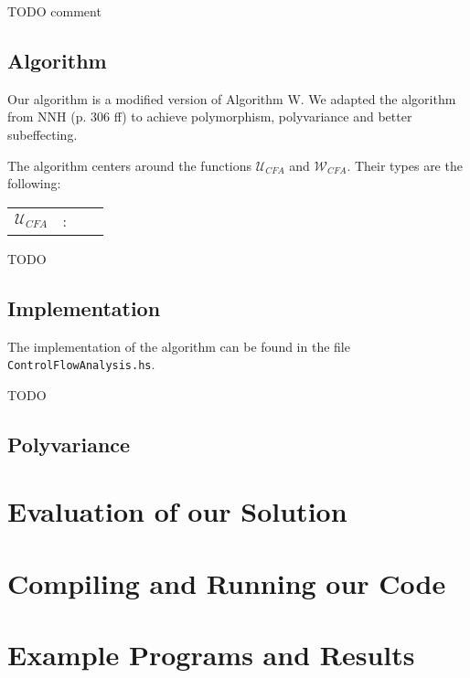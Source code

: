 \documentclass[a4paper,11pt]{article}
\begin{document}
\begin{prooftree}
\end{prooftree}

TODO comment

\subsection{Algorithm}
Our algorithm is a modified version of Algorithm W. We adapted the algorithm from NNH (p. 306 ff) to achieve polymorphism, polyvariance and better subeffecting. 

The algorithm centers around the functions $\mathcal{U}_{CFA}$ and $\mathcal{W}_{CFA}$. Their types are the following:
\begin{tabular}{l l l l}
$\mathcal{U}_{CFA}$ & : & 

\end{tabular}

TODO

\subsection{Implementation}
The implementation of the algorithm can be found in the file \texttt{ControlFlowAnalysis.hs}. 

TODO

\subsection{Polyvariance}


\section{Evaluation of our Solution}


\section{Compiling and Running our Code}


\section{Example Programs and Results}
\end{document}
